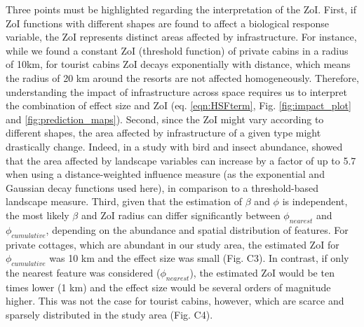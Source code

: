 \documentclass[titlepage]{article}
\begin{document}
Three points must be highlighted regarding the interpretation of the ZoI.
First, if ZoI functions with different shapes are found to affect a biological response variable, the ZoI represents distinct areas affected by infrastructure. For instance, while we found a constant ZoI (threshold function) of private cabins in a radius of 10km, for tourist cabins ZoI decays exponentially with distance, which means the radius of 20 km around the resorts are not affected homogeneously. Therefore, understanding the impact of infrastructure across space requires us to interpret the combination of effect size and ZoI (eq. \ref{eqn:HSFterm}, Fig. \ref{fig:impact_plot} and \ref{fig:prediction_maps}). Second, since the ZoI might vary according to different shapes, the area affected by infrastructure of a given type might drastically change. Indeed, in a study with bird and insect abundance, \citet{miguet_how_2017} showed that the area affected by landscape variables can increase by a factor of up to 5.7 when using a distance-weighted influence measure (as the exponential and Gaussian decay functions used here), in comparison to a threshold-based landscape measure. Third, given that the estimation of $\beta$ and $\phi$ is independent, the most likely $\beta$ and ZoI radius can differ significantly between $\phi_{nearest}$ and $\phi_{cumulative}$, depending on the abundance and spatial distribution of features. For private cottages, which are abundant in our study area, the estimated ZoI for $\phi_{cumulative}$ was 10 km and the effect size was small (Fig. C3). In contrast, if only the nearest feature was considered ($\phi_{nearest}$), the estimated ZoI would be ten times lower (1 km) and the effect size would be several orders of magnitude higher. This was not the case for tourist cabins, however, which are scarce and sparsely distributed in the study area (Fig. C4).


\end{document}
